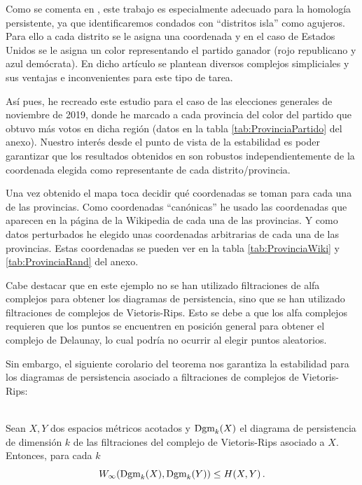 Como se comenta en \cite{votosArticulo}, este trabajo es especialmente adecuado para la homología persistente, ya que identificaremos condados con ``distritos isla'' como agujeros. Para ello a cada distrito se le asigna una coordenada y en el caso de Estados Unidos se le asigna un color representando el partido ganador (rojo republicano y azul demócrata). En dicho artículo se plantean diversos complejos simpliciales y sus ventajas e inconvenientes para este tipo de tarea.

Así pues, he recreado este estudio para el caso de las elecciones generales de noviembre de 2019, donde he marcado a cada provincia del color del partido que obtuvo más votos en dicha región (datos en la tabla \ref{tab:ProvinciaPartido} del anexo). Nuestro interés desde el punto de vista de la estabilidad es poder garantizar que los resultados obtenidos en \cite{votosArticulo} son robustos independientemente de la coordenada elegida como representante de cada distrito/provincia.

Una vez obtenido el mapa toca decidir qué coordenadas se toman para cada una de las provincias. Como coordenadas ``canónicas'' he usado las coordenadas que aparecen en la página de la Wikipedia de cada una de las provincias. Y como datos perturbados he elegido unas coordenadas arbitrarias de cada una de las provincias. Estas coordenadas se pueden ver en la tabla \ref{tab:ProvinciaWiki} y \ref{tab:ProvinciaRand} del anexo.

Cabe destacar que en este ejemplo no se han utilizado filtraciones de alfa complejos para obtener los diagramas de persistencia, sino que se han utilizado filtraciones de complejos de Vietoris-Rips. Esto se debe a que los alfa complejos requieren que los puntos se encuentren en posición general para obtener el complejo de Delaunay, lo cual podría no ocurrir al elegir puntos aleatorios.

Sin embargo, el siguiente corolario del teorema \cite[Theorem~5.2]{persistenciaRips} nos garantiza la estabilidad para los diagramas de persistencia asociado a filtraciones de complejos de Vietoris-Rips:

\begin{corollary}
$ $\\
Sean $X, Y$ dos espacios métricos acotados y $\text{\rm Dgm}_k(X)$ el diagrama de persistencia de dimensión $k$ de las filtraciones del complejo de Vietoris-Rips asociado a $X$. Entonces, para cada $k$
\[
W_\infty(\text{\rm Dgm}_k(X), \text{\rm Dgm}_k(Y)) \leq H(X, Y)\,.
\]
\end{corollary}

